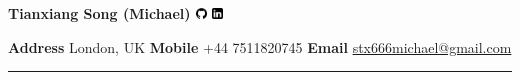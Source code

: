 \documentclass[9pt,a4paper]{article} %
\renewcommand{\title}[1]{
{\huge{\color{slateblue}\textbf{#1}}\\} %
}
\begin{document}
\thispagestyle{empty}
\pagestyle{empty}


\begin{center}
\title{Tianxiang Song (Michael) \href{https://github.com/Stx666Michael}{\includegraphics[width=0.022\textwidth]{images/github-logo.png}} \href{https://www.linkedin.com/in/tianxiang-song-113b3223a/}{\includegraphics[width=0.022\textwidth]{images/LinkedIn-logo.png}}}
\end{center}

\begin{center}
\textbf{Address} London, UK \hspace{1.2cm} 
\textbf{Mobile} +44 7511820745 \hspace{1.2cm} 
\textbf{Email} \href{mailto:stx666michael@gmail.com}{stx666michael@gmail.com}
\end{center}

\rule{\textwidth}{0.2mm}\\[-0.5em]
\end{document}
